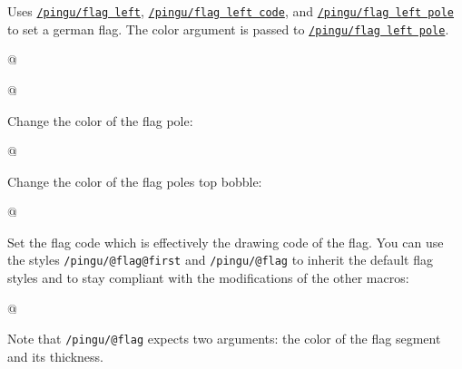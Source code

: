 \documentclass[parskip=half,english,numbers=noenddot,footnotes=nomultiple,oneside]{scrartcl}
\def\lpingu#1{\lstinline[style=lstpingu,language=pingulang]'#1'}
\newcommand*\keyref[2][/pingu/]{\hyperref[pk:#1#2]{\lpingu{#1#2}}}
\begin{document}
	Uses \keyref{flag left}, \keyref{flag left code}, and \keyref{flag left pole} to set a german flag. The color argument is passed to \keyref{flag left pole}.
\begin{tcblisting}{@}
\begin{tikzpicture}
	\pingu[german flag left=green]
\end{tikzpicture}
\end{tcblisting}
\endshowkeyexplain


\begin{tcblisting}{@}
\begin{tikzpicture}
	\pingu[flag right=green]
\end{tikzpicture}
\end{tcblisting}
\endshowkeyexplain

Change the color of the flag pole:
	\begin{tcblisting}{@}
\begin{tikzpicture}
	\pingu[flag right, flag right pole=green]
\end{tikzpicture}
\end{tcblisting}
\endsubkeyexplain

Change the color of the flag poles top bobble:
	\begin{tcblisting}{@}
\begin{tikzpicture}
	\pingu[flag right, flag right bobble=green]
\end{tikzpicture}
\end{tcblisting}
\endsubkeyexplain

Set the flag code which is effectively the drawing code of the flag.
You can use the styles \lpingu{/pingu/@flag@first} and \lpingu{/pingu/@flag} to inherit the default flag styles and to stay compliant with the modifications of the other macros:
	\begin{tcblisting}{@}
\begin{tikzpicture}
	\pingu[flag right, flag right code={
	  \node[/pingu/@flag@first,
	  	/pingu/@flag={blue}{5mm}]
	  		(upper) at (0,0) {};
	  \node[below,/pingu/@flag={black}{4mm}]
	  	(lower) at (upper.south) {};
	}]
\end{tikzpicture}
\end{tcblisting}
Note that \lpingu{/pingu/@flag} expects two arguments: the color of the flag segment and its thickness.
\endsubkeyexplain
\end{document}
